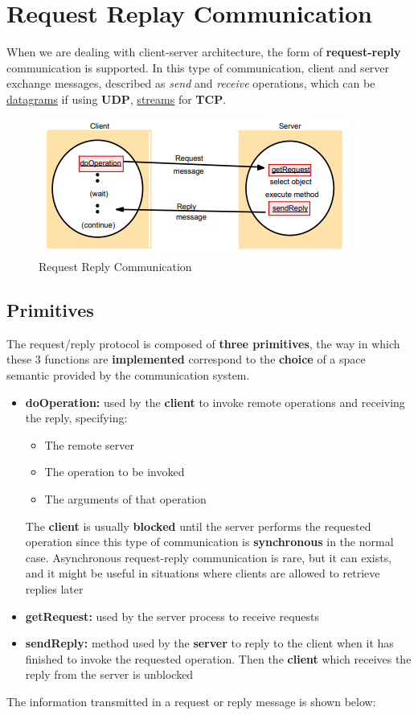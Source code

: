 \chapter{Request Replay Communication}
When we are dealing with client-server architecture, the form of \textbf{request-reply} communication is supported. In this type of communication, client and server exchange messages, described as \textit{send} and \textit{receive} operations, which can be \underline{datagrams} if using \textbf{UDP}, \underline{streams} for \textbf{TCP}.

\begin{figure}[!h]
    \centering
    \includegraphics[width=.7\linewidth]{images/requestReplayCommunication/requestreplaycomm.png}
    \caption{Request Reply Communication}
\end{figure}

\section{Primitives}
The request/reply protocol is composed of \textbf{three primitives}, the way in which these 3 functions are \textbf{implemented} correspond to the \textbf{choice} of a space semantic provided by the communication system.
\begin{itemize}
    \item \textbf{doOperation:} used by the \textbf{client} to invoke remote operations and receiving the reply, specifying:
        \begin{itemize}
            \item The remote server
            \item The operation to be invoked
            \item The arguments of that operation 
        \end{itemize}
    The \textbf{client} is usually \textbf{blocked} until the server performs the requested operation since this type of communication is \textbf{synchronous} in the normal case. Asynchronous request-reply communication is rare, but it can exists, and it might be useful in situations where clients are allowed to retrieve replies later
    \item \textbf{getRequest:} used by the server process to receive requests
    \item \textbf{sendReply:} method used by the \textbf{server} to reply to the client when it has finished to invoke the requested operation. Then the \textbf{client} which receives the reply from the server is unblocked
\end{itemize}
The information transmitted in a request or reply  message is shown below:

